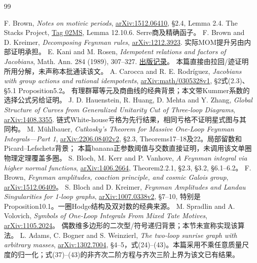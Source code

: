 \documentclass[11pt,a4paper]{ctexart}
\theoremstyle{cnplain}\newtheorem{theorem}{定理}[section]
\theoremstyle{definition}\newtheorem{definition}[theorem]{定义}
\theoremstyle{remark}\newtheorem{remark}[theorem]{注}
\begin{document}
\begin{thebibliography}{99}\raggedright
{} F. Brown, \emph{Notes on motivic periods},
\href{https://arxiv.org/abs/1512.06410}{arXiv:1512.06410},
\S2.4, Lemma 2.4.
 The Stacks Project,
\href{https://stacks.math.columbia.edu/tag/02MS}{Tag 02MS},
Lemma 12.10.6. Serre商及精确函子。
 F. Brown and D. Kreimer, \emph{Decomposing Feynman rules},
\href{https://arxiv.org/abs/1212.3923}{arXiv:1212.3923}.
实际MOM提升另由内部证明承担。
 E. Kani and M. Rosen,
\emph{Idempotent relations and factors of Jacobians},
Math. Ann. 284 (1989), 307--327.
\href{https://eudml.org/doc/164555}{出版记录}。
本篇直接由拉回/迹证明所用分解，未声称本批通读该文。
 A. Carocca and R. E. Rodr\'iguez,
\emph{Jacobians with group actions and rational idempotents},
\href{https://arxiv.org/abs/math/0305328}{arXiv:math/0305328v1},
\S2式(2.3)、\S5.1 Proposition5.2。
有理群幂等元及商曲线的经典背景；本文带Kummer系数的选择公式另给证明。
 J. D. Hauenstein, R. Huang, D. Mehta and Y. Zhang,
\emph{Global Structure of Curves from Generalized Unitarity Cut of Three-loop Diagrams},
\href{https://arxiv.org/abs/1408.3355}{arXiv:1408.3355}.
链式White-house亏格为先行结果，相同亏格不证明星式图与其同构。
 M. M\"uhlbauer,
\emph{Cutkosky's Theorem for Massive One-Loop Feynman Integrals---Part 1},
\href{https://arxiv.org/abs/2206.08402}{arXiv:2206.08402v2},
\S2.3, Theorems17--18及22。局部留数和Picard--Lefschetz背景；
本篇banana正参数阈值与交数直接证明，未调用该文单圈物理定理覆盖多圈。
 S. Bloch, M. Kerr and P. Vanhove,
\emph{A Feynman integral via higher normal functions},
\href{https://arxiv.org/abs/1406.2664}{arXiv:1406.2664},
Theorem2.2.1, \S2.3, \S3.2, \S6.1--6.2。
 F. Brown,
\emph{Feynman amplitudes, coaction principle, and cosmic Galois group},
\href{https://arxiv.org/abs/1512.06409}{arXiv:1512.06409}。
 S. Bloch and D. Kreimer,
\emph{Feynman Amplitudes and Landau Singularities for 1-loop graphs},
\href{https://arxiv.org/abs/1007.0338}{arXiv:1007.0338v2},
\S7--10, 特别是Proposition10.1。一圈Hodge结构及双对数的经典来源。
 M. Spradlin and A. Volovich,
\emph{Symbols of One-Loop Integrals From Mixed Tate Motives},
\href{https://arxiv.org/abs/1105.2024}{arXiv:1105.2024}。
偶数维多边形的二次型/符号递归背景；本节未宣称实现该算法。
 L. Adams, C. Bogner and S. Weinzierl,
\emph{The two-loop sunrise graph with arbitrary masses},
\href{https://arxiv.org/abs/1302.7004}{arXiv:1302.7004},
\S4--5，式(24)--(43)。本篇采用不乘任意质量尺度的归一化；式(37)--(43)的非齐次二阶方程与齐次三阶上界为该文已有结果。

\end{thebibliography}
\end{document}
